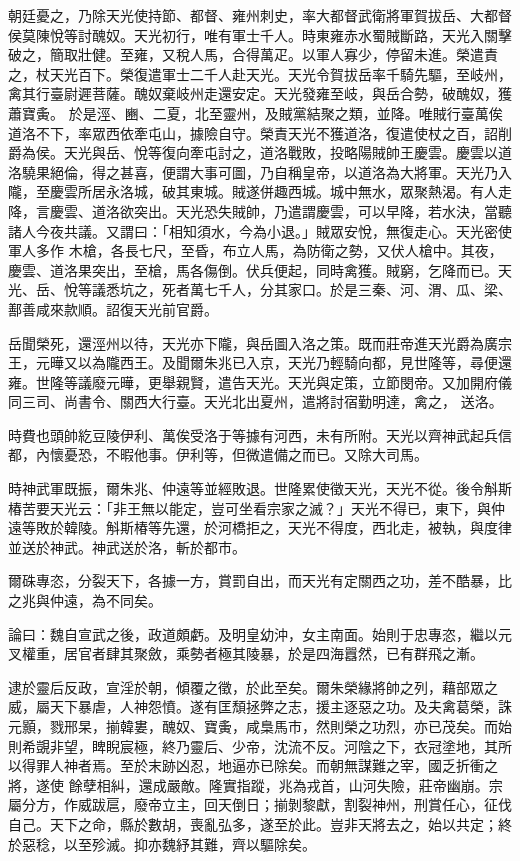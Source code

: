 \begin{pinyinscope}
 朝廷憂之，乃除天光使持節、都督、雍州刺史，率大都督武衛將軍賀拔岳、大都督侯莫陳悅等討醜奴。天光初行，唯有軍士千人。時東雍赤水蜀賊斷路，天光入關擊破之，簡取壯健。至雍，又稅人馬，合得萬疋。以軍人寡少，停留未進。榮遣責之，杖天光百下。榮復遣軍士二千人赴天光。天光令賀拔岳率千騎先驅，至岐州，禽其行臺尉遲菩薩。醜奴棄岐州走還安定。天光發雍至岐，與岳合勢，破醜奴，獲蕭寶夤。
 於是涇、豳、二夏，北至靈州，及賊黨結聚之類，並降。唯賊行臺萬俟道洛不下，率眾西依牽屯山，據險自守。榮責天光不獲道洛，復遣使杖之百，詔削爵為侯。天光與岳、悅等復向牽屯討之，道洛戰敗，投略陽賊帥王慶雲。慶雲以道洛驍果絕倫，得之甚喜，便謂大事可圖，乃自稱皇帝，以道洛為大將軍。天光乃入隴，至慶雲所居永洛城，破其東城。賊遂併趣西城。城中無水，眾聚熱渴。有人走降，言慶雲、道洛欲突出。天光恐失賊帥，乃遣謂慶雲，可以早降，若水決，當聽諸人今夜共議。又謂曰：「相知須水，今為小退。」賊眾安悅，無復走心。天光密使軍人多作
 木槍，各長七尺，至昏，布立人馬，為防衛之勢，又伏人槍中。其夜，慶雲、道洛果突出，至槍，馬各傷倒。伏兵便起，同時禽獲。賊窮，乞降而已。天光、岳、悅等議悉坑之，死者萬七千人，分其家口。於是三秦、河、渭、瓜、梁、鄯善咸來款順。詔復天光前官爵。



 岳聞榮死，還涇州以待，天光亦下隴，與岳圖入洛之策。既而莊帝進天光爵為廣宗王，元曄又以為隴西王。及聞爾朱兆已入京，天光乃輕騎向都，見世隆等，尋便還雍。世隆等議廢元曄，更舉親賢，遣告天光。天光與定策，立節閔帝。又加開府儀同三司、尚書令、關西大行臺。天光北出夏州，遣將討宿勤明達，禽之，
 送洛。



 時費也頭帥紇豆陵伊利、萬俟受洛于等據有河西，未有所附。天光以齊神武起兵信都，內懷憂恐，不暇他事。伊利等，但微遣備之而已。又除大司馬。



 時神武軍既振，爾朱兆、仲遠等並經敗退。世隆累使徵天光，天光不從。後令斛斯椿苦要天光云：「非王無以能定，豈可坐看宗家之滅？」天光不得已，東下，與仲遠等敗於韓陵。斛斯椿等先還，於河橋拒之，天光不得度，西北走，被執，與度律並送於神武。神武送於洛，斬於都市。



 爾硃專恣，分裂天下，各據一方，賞罰自出，而天光有定關西之功，差不酷暴，比之兆與仲遠，為不同矣。



 論曰：魏自宣武之後，政道頗虧。及明皇幼沖，女主南面。始則于忠專恣，繼以元叉權重，居官者肆其聚斂，乘勢者極其陵暴，於是四海囂然，已有群飛之漸。



 逮於靈后反政，宣淫於朝，傾覆之徵，於此至矣。爾朱榮緣將帥之列，藉部眾之威，屬天下暴虐，人神怨憤。遂有匡頹拯弊之志，援主逐惡之功。及夫禽葛榮，誅元顥，戮邢杲，揃韓婁，醜奴、寶夤，咸梟馬市，然則榮之功烈，亦已茂矣。而始則希覬非望，睥睨宸極，終乃靈后、少帝，沈流不反。河陰之下，衣冠塗地，其所以得罪人神者焉。至於末跡凶忍，地逼亦已除矣。而朝無謀難之宰，國乏折衝之將，遂使
 餘孽相糾，還成嚴敵。隆實指蹤，兆為戎首，山河失險，莊帝幽崩。宗屬分方，作威跋扈，廢帝立主，回天倒日；揃剝黎獻，割裂神州，刑賞任心，征伐自己。天下之命，縣於數胡，喪亂弘多，遂至於此。豈非天將去之，始以共定；終於惡稔，以至殄滅。抑亦魏紓其難，齊以驅除矣。



\end{pinyinscope}